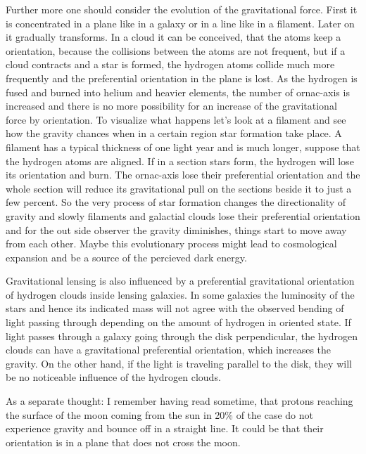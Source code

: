 Further more one should consider the evolution of the gravitational force. First it is concentrated in a plane like in a galaxy or in a line like in a filament. Later on it gradually transforms. In a cloud it can be conceived, that the atoms keep a orientation, because the collisions between the atoms are not frequent, but if a cloud contracts and a star is formed, the hydrogen atoms collide much more frequently and the preferential orientation in the plane is lost. As the hydrogen is fused and burned into helium and heavier elements, the number of ornac-axis is increased and there is no more possibility for an increase of the  gravitational force by orientation. To visualize what happens let's look at a filament and see how the gravity chances when in a certain region star formation take place. A filament has a typical thickness of one light year and is much longer, suppose that the hydrogen atoms are aligned. If in a section stars form, the hydrogen will lose its orientation and burn. The ornac-axis lose their preferential orientation and the whole section will reduce its gravitational pull on the sections beside it to just a few percent. So the very process of star formation changes the directionality of gravity and slowly filaments and galactial clouds lose their preferential orientation and for the out side observer the gravity diminishes, things start to move away from each other. Maybe this evolutionary process might lead to cosmological expansion and be a source of the percieved dark energy.

Gravitational lensing is also influenced by a preferential gravitational orientation of hydrogen clouds inside lensing galaxies. In some galaxies the luminosity of the stars and hence its indicated mass will not agree with the observed bending of light passing through depending on the amount of hydrogen in oriented state. If light passes through a galaxy going through the disk perpendicular, the hydrogen clouds can have a gravitational preferential orientation, which increases the gravity. On the other hand, if the light is traveling parallel to the disk, they will be no noticeable influence of the hydrogen clouds.

As a separate thought: I remember having read sometime, that protons reaching the surface of the moon coming from the sun in 20\% of the case do not experience gravity and bounce off in a straight line. It could be that their orientation is in a plane that does not cross the moon.




